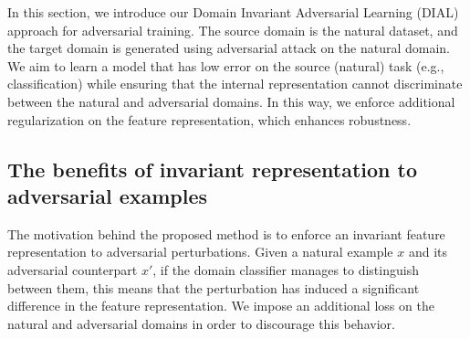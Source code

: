 In this section, we introduce our Domain Invariant Adversarial Learning (DIAL) approach for adversarial training. The source domain is the natural dataset, and the target domain is generated using adversarial attack on the natural domain. We aim to learn a model that has low error on the source (natural) task (e.g., classification) while ensuring that the internal representation cannot discriminate between the natural and adversarial domains. %
In this way,
we enforce additional regularization on the feature representation, which 
enhances robustness.


\subsection{The benefits of invariant representation to adversarial examples}
The motivation behind the proposed method is to enforce an invariant feature representation to adversarial perturbations. Given a natural example $x$ and its adversarial counterpart $x'$, if the domain classifier manages to distinguish between 
them, this means
that the perturbation has induced a 
significant
difference in the feature representation. We impose an additional loss on the natural and adversarial domains in order to discourage this behavior. 



